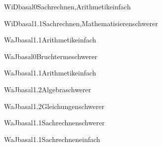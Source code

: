 \documentclass[12pt]{article}
\begin{document}
\begin{Add}{WiD}{basal0}{Sachrechnen,Arithmetik}{einfach}
\end{Add}

\begin{Add}{WiD}{basal1.1}{Sachrechnen,Mathematisieren}{schwerer}
\end{Add}


\begin{Add}{WaJ}{basal1.1}{Arithmetik}{einfach}
\end{Add}

\begin{Add}{WaJ}{basal0}{Bruchterme}{schwerer}
\end{Add}

\begin{Add}{WaJ}{basal1.1}{Arithmetik}{einfach}
\end{Add}

\begin{Add}{WaJ}{basal1.2}{Algebra}{schwerer}
\end{Add}

\begin{Add}{WaJ}{basal1.2}{Gleichungen}{schwerer}
\end{Add}

\begin{Add}{WaJ}{basal1.1}{Sachrechnen}{schwerer}
\end{Add}

\begin{Add}{WaJ}{basal1.1}{Sachrechnen}{einfach}
\end{Add}
\end{document}
